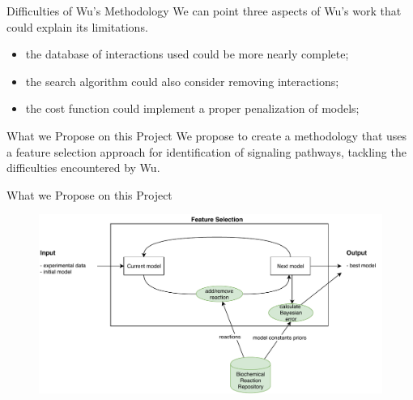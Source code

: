 \documentclass{beamer}
\begin{document}
\begin{frame}{Difficulties of Wu's Methodology}
We can point three aspects of Wu's work that could explain its 
limitations.
\begin{itemize}
\pause
\item{the database of interactions used could be more nearly complete;} 
\pause
\item{the search algorithm could also consider removing interactions;}
\pause
\item{the cost function could implement a proper penalization of 
models;}
\end{itemize}
\end{frame}


\begin{frame}{What we Propose on this Project}
We propose to create a methodology that uses a feature selection 
approach for identification of signaling pathways, tackling the 
difficulties encountered by Wu.
\end{frame}

\begin{frame}{What we Propose on this Project}
\begin{flushleft}
\begin{figure}
    \includegraphics[scale=.57]{introduction/my_dissertation_diagram.pdf}
\end{figure}
\end{flushleft}
\end{frame}




\end{document}

